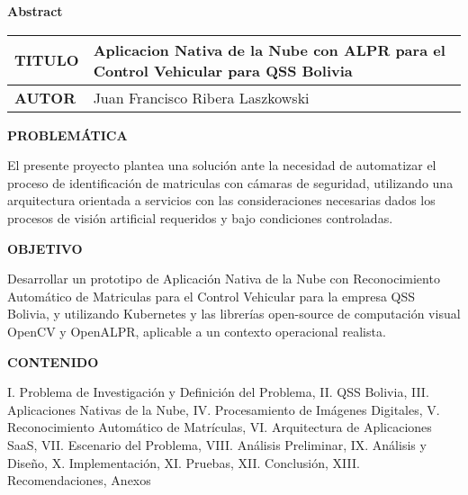 {
\thispagestyle{first-pages}

\Large \textbf{Abstract}
\normalsize
\capstartfalse
\begin{table}[h]
\begin{center}
\renewcommand{\arraystretch}{0.8}%
\begin{tabular}{| >{\centering\arraybackslash}m{1in} | >{\centering\arraybackslash}m{4in} |}
\hline
\vspace{0.1cm}
\textbf{TITULO}  & Aplicacion Nativa de la Nube con ALPR para el Control Vehicular para QSS Bolivia \\ \hline
\vspace{0.1cm}
\textbf{AUTOR}  & Juan Francisco Ribera Laszkowski \\ \hline

\end{tabular}
\label{tabular:UKJPNdata}
\end{center}
\end{table}

\textbf{PROBLEMÁTICA}

El presente proyecto plantea una solución ante la necesidad de automatizar el proceso de identificación de matriculas con cámaras de seguridad, utilizando una arquitectura orientada a servicios con las consideraciones necesarias dados los procesos de visión artificial requeridos y bajo condiciones controladas.

\textbf{OBJETIVO}

Desarrollar un prototipo de Aplicación Nativa de la Nube con Reconocimiento Automático de Matriculas para el Control Vehicular para la empresa QSS Bolivia, y utilizando Kubernetes y las librerías open-source de computación visual OpenCV y OpenALPR, aplicable a un contexto operacional realista.

\textbf{CONTENIDO}

I. Problema de Investigación y Definición del Problema, II. QSS Bolivia, III. Aplicaciones Nativas de la Nube, IV. Procesamiento de Imágenes Digitales, V. Reconocimiento Automático de Matrículas, VI. Arquitectura de Aplicaciones SaaS, VII. Escenario del Problema, VIII. Análisis Preliminar, IX. Análisis y Diseño, X. Implementación, XI. Pruebas, XII. Conclusión, XIII. Recomendaciones, Anexos
\capstartfalse
\begin{table}[h]
\begin{center}
\renewcommand{\arraystretch}{0.8}%
\begin{tabular}{| >{\centering\arraybackslash}m{1.5in} | >{\centering\arraybackslash}m{3.5in} |}
\hline


\end{tabular}
\end{center}
\end{table}}
